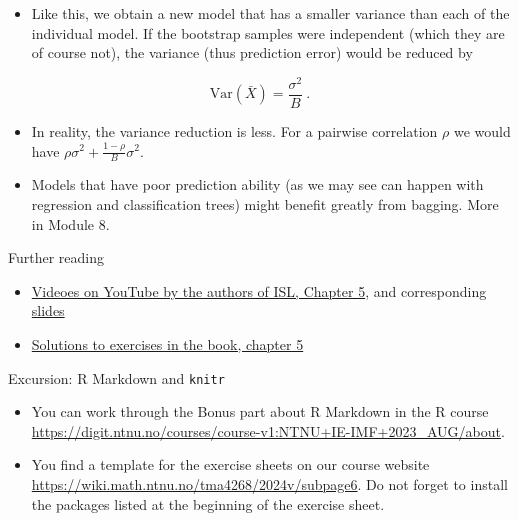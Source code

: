 \documentclass[
  10pt,
  ignorenonframetext,
]{beamer}
\providecommand{\tightlist}{%
  \setlength{\itemsep}{0pt}\setlength{\parskip}{0pt}}
\begin{document}
\begin{frame}
\begin{itemize}
\tightlist
\item
  Like this, we obtain a new model that has a smaller variance than each
  of the individual model. If the bootstrap samples were independent
  (which they are of course not), the variance (thus prediction error)
  would be reduced by
\end{itemize}

\[\text{Var}(\bar{X})=\frac{\sigma^2}{B} \ .\] \vspace{2mm}

\begin{itemize}
\tightlist
\item
  In reality, the variance reduction is less. For a pairwise correlation
  \(\rho\) we would have \(\rho\sigma^2 + \frac{1-\rho}{B}\sigma^2\).
\end{itemize}

\vspace{2mm}

\begin{itemize}
\tightlist
\item
  Models that have poor prediction ability (as we may see can happen
  with regression and classification trees) might benefit greatly from
  bagging. More in Module 8.
\end{itemize}
\end{frame}

\begin{frame}{Further reading}
\protect\hypertarget{further-reading}{}
\begin{itemize}
\tightlist
\item
  \href{https://www.youtube.com/playlist?list=PL5-da3qGB5IA6E6ZNXu7dp89_uv8yocmf}{Videoes
  on YouTube by the authors of ISL, Chapter 5}, and corresponding
  \href{https://lagunita.stanford.edu/c4x/HumanitiesScience/StatLearning/asset/cv_boot.pdf}{slides}
\item
  \href{https://rstudio-pubs-static.s3.amazonaws.com/65561_43c0eaaa8565414eae333b47038f716c.html}{Solutions
  to exercises in the book, chapter 5}
\end{itemize}
\end{frame}

\begin{frame}{Excursion: R Markdown and \texttt{knitr}}
\protect\hypertarget{excursion-r-markdown-and-knitr}{}
\begin{itemize}
\item
  You can work through the Bonus part about R Markdown in the R course
  \url{https://digit.ntnu.no/courses/course-v1:NTNU+IE-IMF+2023_AUG/about}.
\item
  You find a template for the exercise sheets on our course website
  \url{https://wiki.math.ntnu.no/tma4268/2024v/subpage6}. Do not forget
  to install the packages listed at the beginning of the exercise sheet.
\end{itemize}
\end{frame}
\end{document}
